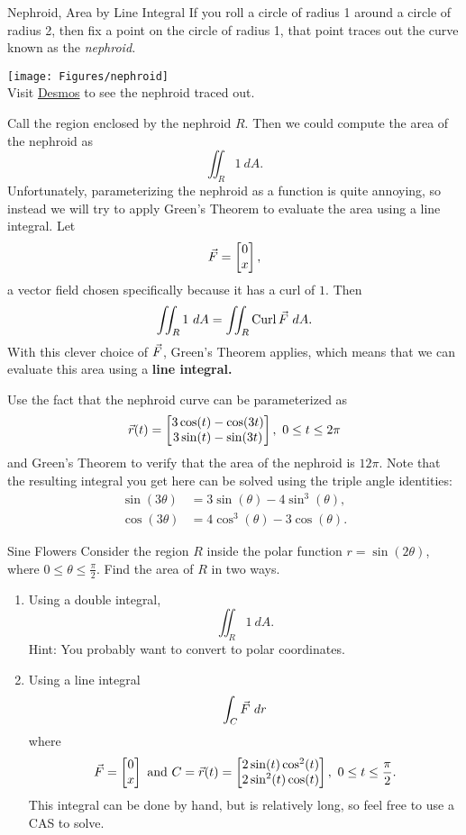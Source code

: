 \begin{exercise}{Nephroid, Area by Line Integral}
If you roll a circle of radius 1 around a circle of radius 2, then fix a point on the circle of radius 1, that point traces out the curve known as the \textit{nephroid.}

\vspace{1em}

\begin{center}
\texttt{[image: Figures/nephroid]}\\
Visit \href{https://www.desmos.com/calculator/a8o5rvqufn}{Desmos} to see the nephroid traced out.
\end{center}

\vspace{1em}

Call the region enclosed by the nephroid $R$. Then we could compute the area of the nephroid as $$\iint_R 1 \ dA.$$
Unfortunately, parameterizing the nephroid as a function is quite annoying, so instead we will try to apply Green's Theorem to evaluate the area using a line integral. Let $$\vec{F}=\begin{bmatrix}0\\x\end{bmatrix}, $$ a vector field chosen specifically because it has a curl of $1$. Then $$\iint_R 1 \ dA =\iint_R \curl\vcF \ dA.$$ With this clever choice of $\vec{F}$, Green's Theorem applies, which means that we can evaluate this area using a \textbf{line integral.}

\vspace{1em}

Use the fact that the nephroid curve can be parameterized as $$\vcr(t)=\bmat{3\cos(t)-\cos(3t)\\3\sin(t)-\sin(3t)},\ 0\leq t\leq 2\pi$$ and Green's Theorem to verify that the area of the nephroid is $12\pi$. Note that the resulting integral you get here can be solved using the triple angle identities:
\begin{align*}
\sin(3\theta)&=3\sin(\theta)-4\sin^3(\theta),\\
\cos(3\theta)&=4\cos^3(\theta)-3\cos(\theta).
\end{align*}
\end{exercise}

\begin{exercise}{Sine Flowers}
Consider the region $R$ inside the polar function $r=\sin(2\theta)$, where $0\leq\theta\leq \frac{\pi}{2}$. Find the area of $R$ in two ways.

\vspace{1em}
\begin{enumerate}
\item Using a double integral, $$\iint_R 1\ dA.$$ Hint: You probably want to convert to polar coordinates.
\vspace{1em}
\item Using a line integral $$\int_C \vcF\ dr $$ where $$\vec{F}=\begin{bmatrix}0\\x\end{bmatrix}\text{ and }C=\vec{r}(t)=\begin{bmatrix}2\sin(t)\cos^2(t)\\2\sin^2(t)\cos(t)\end{bmatrix},\ 0\leq t\leq \frac{\pi}{2}.$$ This integral can be done by hand, but is relatively long, so feel free to use a CAS to solve.
\end{enumerate}
\end{exercise}
